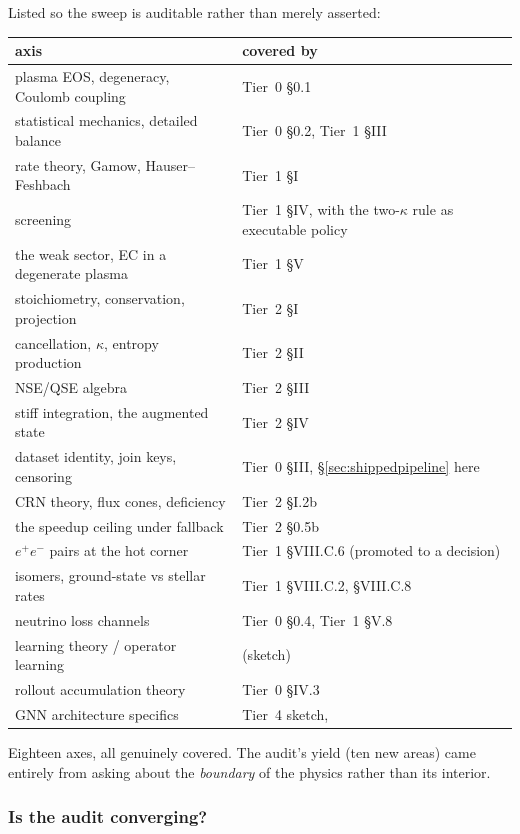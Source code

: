 Listed so the sweep is auditable rather than merely asserted:

\begingroup
\small
\begin{tabularx}{\textwidth}{@{}L{6.4cm} Y@{}}
\toprule
\textbf{axis} & \textbf{covered by} \\
\midrule
plasma EOS, degeneracy, Coulomb coupling & Tier~0 \S 0.1 \\
statistical mechanics, detailed balance & Tier~0 \S 0.2, Tier~1 \S III \\
rate theory, Gamow, Hauser--Feshbach & Tier~1 \S I \\
screening & Tier~1 \S IV, with the two-$\kappa$ rule as executable policy \\
the weak sector, EC in a degenerate plasma & Tier~1 \S V \\
stoichiometry, conservation, projection & Tier~2 \S I \\
cancellation, $\kappa$, entropy production & Tier~2 \S II \\
NSE/QSE algebra & Tier~2 \S III \\
stiff integration, the augmented state & Tier~2 \S IV \\
dataset identity, join keys, censoring & Tier~0 \S III, \S\ref{sec:shippedpipeline} here \\
CRN theory, flux cones, deficiency & Tier~2 \S I.2b \\
the speedup ceiling under fallback & Tier~2 \S 0.5b \\
$e^{+}e^{-}$ pairs at the hot corner & Tier~1 \S VIII.C.6 (promoted to a decision) \\
isomers, ground-state vs stellar rates & Tier~1 \S VIII.C.2, \S VIII.C.8 \\
neutrino loss channels & Tier~0 \S 0.4, Tier~1 \S V.8 \\
learning theory / operator learning &  (sketch) \\
rollout accumulation theory & Tier~0 \S IV.3 \\
GNN architecture specifics & Tier~4 sketch,  \\
\bottomrule
\end{tabularx}
\endgroup

Eighteen axes, all genuinely covered. The audit's yield (ten new areas) came
entirely from asking about the \emph{boundary} of the physics rather than its
interior.

\subsubsection{Is the audit converging?}
\label{sec:converging}

